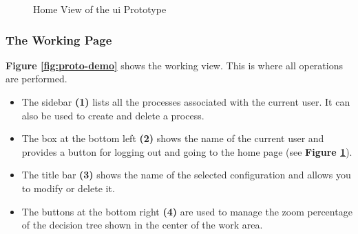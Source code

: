    \begin{figure}[h]
    \centering
    \caption{\label{fig:proto-home}  Home View of the \acrshort{ui} Prototype}
    \end{figure}
    
    
    \subsubsection{The Working Page}
    \textbf{Figure \ref{fig:proto-demo}} shows the working view. This is where all operations are performed. 
    
    \begin{itemize}
        \item The sidebar \textbf{(1)} lists all the processes associated with the current user. It can also be used to create and delete a process.
        \item The box at the bottom left \textbf{(2)} shows the name of the current user and provides a button for logging out and going to the home page (see \textbf{Figure \ref{fig:proto-home}}).
        \item The title bar \textbf{(3)} shows the name of the selected configuration and allows you to modify or delete it.
        \item The buttons at the bottom right \textbf{(4)} are used to manage the zoom percentage of the decision tree shown in the center of the work area.
    \end{itemize}
    
